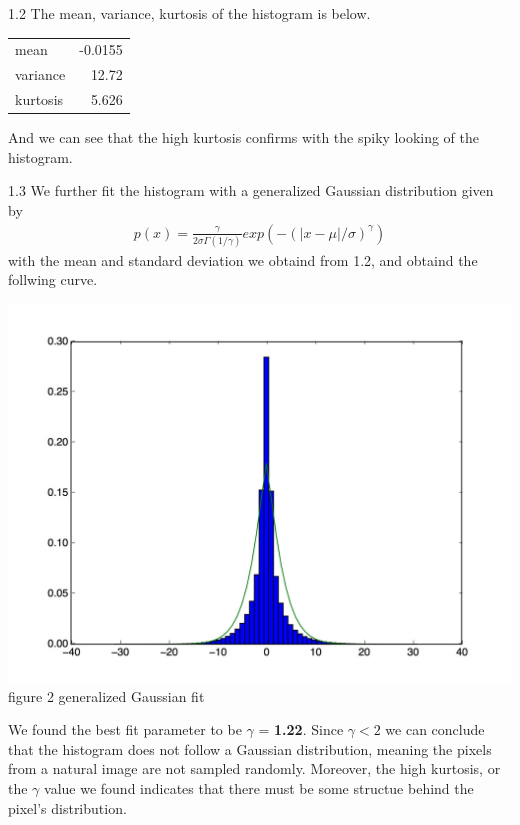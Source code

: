 \documentclass[12pt]{article}
\newenvironment{problem}[2][Problem]{\begin{trivlist}
\item[\hskip \labelsep {\bfseries #1}\hskip \labelsep {\bfseries #2}]}{\end{trivlist}}
\begin{document}
\begin{problem}{1. High Kurtosis and Scale Invariance}
\item{1.2 The mean, variance, kurtosis of the histogram is below.}
\begin{center}
\begin{tabular}{l | r}
	mean & -0.0155\\
	variance & 12.72\\
	kurtosis & 5.626\\
\end{tabular}
\end{center}
And we can see that the high kurtosis confirms with the spiky looking of the histogram.\\
\item{1.3} We further fit the histogram with a generalized Gaussian distribution given by
\begin{align*}
	p(x) = \frac{\gamma}{2\sigma\Gamma(1/\gamma)} exp(-(|x-\mu|/\sigma)^{\gamma})
\end{align*}
with the mean and standard deviation we obtaind from 1.2, and obtaind the follwing curve.
\begin{center}
		\includegraphics[height=10cm]{results/q1_3.jpg}{\\figure 2 generalized Gaussian fit}
\end{center}
We found the best fit parameter to be $\gamma$ = \textbf{1.22}. Since $\gamma < 2$ we can conclude that the histogram does not follow a Gaussian distribution, meaning the pixels from a natural image are not sampled randomly. Moreover, the high kurtosis, or the $\gamma$ value we found indicates that there must be some structue behind the pixel's distribution.\\

\end{problem}
\end{document}
